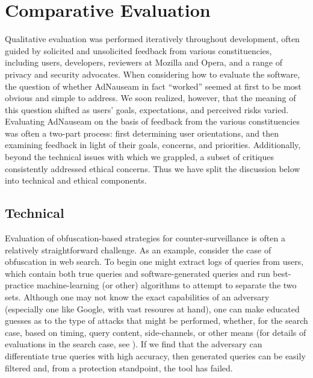 \documentclass[conference]{IEEEtran}
\begin{document}
\section{Comparative Evaluation}

Qualitative evaluation was performed iteratively throughout development, often guided by solicited and unsolicited feedback from various constituencies, including users, developers, reviewers at Mozilla and Opera, and a range of privacy and security advocates. When considering how to evaluate the software, the question of whether AdNauseam in fact “worked” seemed at first to be most obvious and simple to address. We soon realized, however, that the meaning of this question shifted as users' goals, expectations, and perceived risks varied. Evaluating AdNauseam on the basis of feedback from the various constituencies was often a two-part process: first determining user orientations, and then examining feedback in light of their goals, concerns, and priorities. Additionally, beyond the technical issues with which we grappled, a subset of critiques consistently addressed ethical concerns. Thus we have split the discussion below into technical and ethical components.

\subsection{Technical}

Evaluation of obfuscation-based strategies for counter-surveillance is often a relatively straightforward challenge. As an example, consider the case of obfuscation in web search. To begin one might extract logs of queries from users, which contain both true queries and software-generated queries and run best-practice machine-learning (or other) algorithms to attempt to separate the two sets. Although one may not know the exact capabilities of an adversary (especially one like Google, with vast resoures at hand), one can make educated guesses as to the type of attacks that might be performed, whether, for the search case, based on timing, query content, side-channels, or other means (for  details of evaluations in the search case, see \cite{Gervais,Balsa}).  If we find that the adversary can differentiate true queries with high accuracy, then generated queries can be easily filtered and, from a protection standpoint, the tool has failed.
\end{document}
